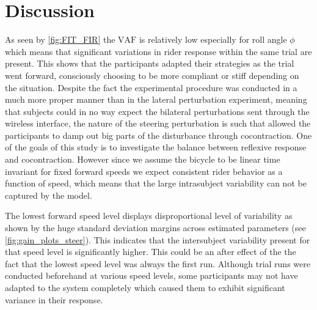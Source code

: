 \section{Discussion}
As seen by \cref{fig:FIT_FIR} the \ensuremath{\mathrm{VAF}} is relatively low especially for roll angle \ensuremath{\phi} which means that significant variations in rider response within the same trial are present. This shows that the participants adapted their strategies as the trial went forward, consciously choosing to be more compliant or stiff depending on the situation. Despite the fact the experimental procedure was conducted in a much more proper manner than in the lateral perturbation experiment, meaning that subjects could in no way expect the bilateral perturbations sent through the wireless interface, the nature of the steering perturbation is such that allowed the participants to damp out big parts of the disturbance through cocontraction. One of the goals of this study is to investigate  the balance between reflexive response and cocontraction. However since we assume the bicycle to be linear time invariant for fixed forward speeds we expect consistent rider behavior as a function of speed, which means that the large intrasubject variability can not be captured by the model.

The lowest forward speed level displays disproportional level of variability as shown by the huge standard deviation margins across estimated parameters (see \cref{fig:gain_plots_steer}). This indicates that the intersubject variability present for that speed level is significantly higher. This could be an after effect of the the fact that the lowest speed level was always the first run. Although trial runs were conducted beforehand at various speed levels, some participants may not have adapted to the system completely which caused them to exhibit significant variance in their response.


